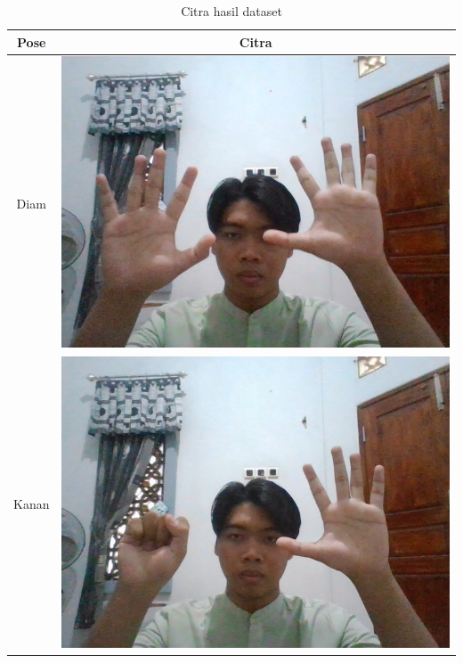 \begin{table}[H]
  \centering
  \caption{Citra hasil dataset}
  \label{tab:citradaset}
  \begin{tabular}{|c|c|}
    \hline
    Pose   & Citra \\ \hline
    Diam   & \includegraphics[width=0.4\linewidth]{../Gambar/posediam.png} \\ \hline
    Kanan  & \includegraphics[width=0.4\linewidth]{../Gambar/posekanan.png} \\ \hline
  \end{tabular}
\end{table}

